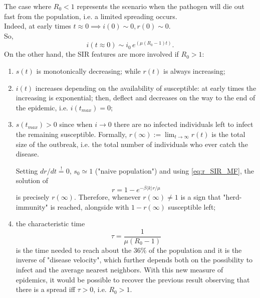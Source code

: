 \documentclass[a4paper,12pt,twoside]{book} %
\theoremstyle{definition}
\begin{document}
The case where $R_0 < 1$ represents the scenario when the pathogen will die out fast from the population, i.e. a limited spreading occurs. 
\\Indeed, at early times $t\approx 0 \implies i(0)\sim 0, r(0)\sim 0$. 
\\So, \cite{barabasi::2016networkbook} \[i(t\approx 0) \sim i_0 \, e^{(\mu(R_0 -1)t)}.\]
On the other hand, the SIR features are more involved if $R_0 > 1$:
\begin{enumerate}
	\item $s(t)$ is monotonically decreasing; while $r(t)$ is always increasing; 
	\item $i(t)$ increases depending on the availability of susceptible: at early times the increasing is exponential; then, deflect and decreases on the way to the end of the epidemic, i.e. $i(t_{max})=0$;
	\item $s(t_{max}) > 0$ since when $i \to 0$ there are no infected individuals left to infect the remaining susceptible. Formally, $r(\infty):=\lim_{t \to \infty} r(t)$ is the total size of the outbreak, i.e. the total number of individuals who ever catch the disease. 
	
	Setting $dr/dt \stackrel{!}{=}0$, $s_0\simeq1$ ("naive population") and using \autoref{eq:r_SIR_MF}, the solution of 
	\begin{equation}
		r = 1 - e^{-\beta \langle k \rangle  r /\mu}
		\label{eq:r_SIR_MF_GiantComp}
	\end{equation}
	is precisely $r(\infty)$. Therefore, whenever $r(\infty)\neq1$ is a sign that "herd-immunity" is reached, alongside with $1-r(\infty)$ susceptible left;
	\item the characteristic time \[ \tau  = \frac{1}{\mu(R_0-1)}\] is the time needed to reach about the $36\%$ of the population and it is the inverse of "disease velocity", which further depends both on the possibility to infect and the average nearest neighbors. With this new measure of epidemics, it would be possible to recover the previous result observing that there is a spread iff $\tau > 0$, i.e. $R_0 > 1$.
\end{enumerate}
\end{document}
